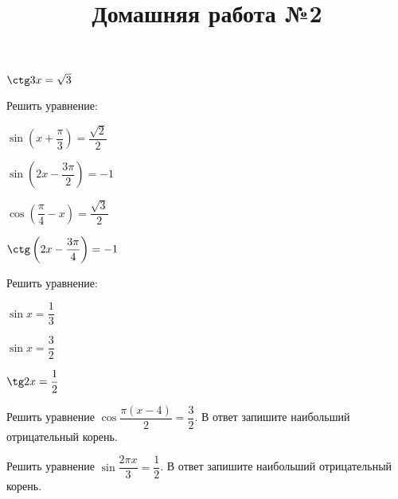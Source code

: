 \begin{listofex}
\begin{enumcols}[itemcolumns=3]
		\item \( \ctg 3x = \sqrt{3} \)
	\end{enumcols}
	\item Решить уравнение:
	\begin{enumcols}[itemcolumns=2]
		\item \( \sin \left( x+\dfrac{\pi}{3} \right) = \dfrac{\sqrt{2}}{2} \)
		\item \( \sin \left( 2x-\dfrac{3\pi}{2} \right) = -1 \)
		\item \( \cos \left( \dfrac{\pi}{4}-x \right)=\dfrac{\sqrt{3}}{2} \)
		\item \( \ctg\left( 2x-\dfrac{3\pi}{4} \right)=-1 \)
	\end{enumcols}
	\item Решить уравнение:
	\begin{enumcols}[itemcolumns=3]
		\item \( \sin x = \dfrac{1}{3} \)
		\item \( \sin x = \dfrac{3}{2}\)
		\item \( \tg 2x = \dfrac{1}{2}\)
	\end{enumcols}
	\item Решить уравнение \( \cos\dfrac{\pi(x-4)}{2}=\dfrac{3}{2} \). В ответ запишите наибольший отрицательный корень.
	\item Решить уравнение \( \sin\dfrac{2\pi x}{3}=\dfrac{1}{2} \). В ответ запишите наибольший отрицательный корень.
\end{listofex}
\newpage
\title{Домашняя работа №2}
